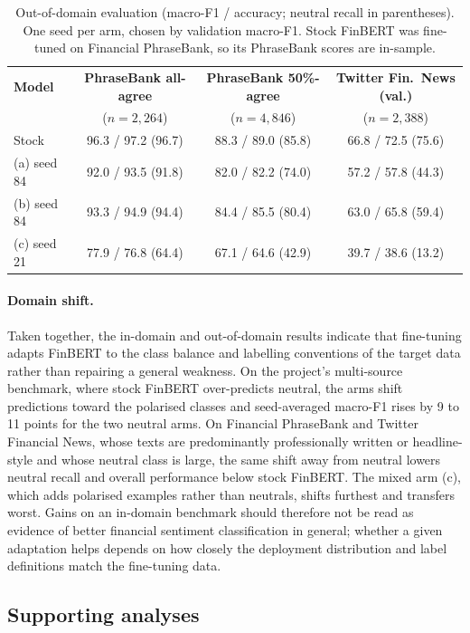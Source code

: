 \documentclass{aims}
\numberwithin{equation}{section}
\begin{document}
\begin{table}[ht]
\centering
\caption{Out-of-domain evaluation (macro-F1 / accuracy; neutral recall in
parentheses). One seed per arm, chosen by validation macro-F1. Stock FinBERT was
fine-tuned on Financial PhraseBank, so its PhraseBank scores are in-sample.}
\label{tab:ood}
\small
\begin{tabular}{lccc}
\toprule
\textbf{Model} & \textbf{PhraseBank all-agree} & \textbf{PhraseBank 50\%-agree} & \textbf{Twitter Fin.\ News (val.)} \\
 & ($n = 2{,}264$) & ($n = 4{,}846$) & ($n = 2{,}388$) \\
\midrule
Stock & 96.3 / 97.2 (96.7) & 88.3 / 89.0 (85.8) & 66.8 / 72.5 (75.6) \\
(a) seed 84 & 92.0 / 93.5 (91.8) & 82.0 / 82.2 (74.0) & 57.2 / 57.8 (44.3) \\
(b) seed 84 & 93.3 / 94.9 (94.4) & 84.4 / 85.5 (80.4) & 63.0 / 65.8 (59.4) \\
(c) seed 21 & 77.9 / 76.8 (64.4) & 67.1 / 64.6 (42.9) & 39.7 / 38.6 (13.2) \\
\bottomrule
\end{tabular}
\end{table}

\paragraph{Domain shift.} Taken together, the in-domain and out-of-domain results
indicate that fine-tuning adapts FinBERT to the class balance and labelling
conventions of the target data rather than repairing a general weakness. On the
project's multi-source benchmark, where stock FinBERT over-predicts neutral, the
arms shift predictions toward the polarised classes and seed-averaged macro-F1
rises by 9 to 11 points for the two neutral arms. On Financial PhraseBank and Twitter Financial News, whose texts are
predominantly professionally written or headline-style and whose neutral class is
large, the same shift away from neutral lowers neutral recall and overall
performance below stock FinBERT. The mixed arm (c), which adds polarised examples
rather than neutrals, shifts furthest and transfers worst. Gains on an in-domain
benchmark should therefore not be read as evidence of better financial sentiment
classification in general; whether a given adaptation helps depends on how closely
the deployment distribution and label definitions match the fine-tuning data.

\subsection{Supporting analyses}
\end{document}
